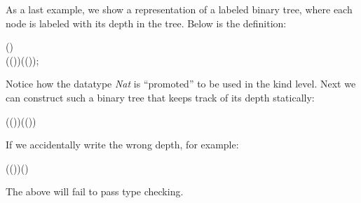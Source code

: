 As a last example, we show a representation of a labeled binary tree,
where each node is labeled with its depth in the tree. Below is the
definition:
\begin{hscode}\SaveRestoreHook
{}%
%
%
%
\>[3]{}\;\;(\mathbin{:})\mathrel{=}\<[E]%
\\
\>[3]{}\<[5]%
\>[5]{}\mid {}\;\;(\;(\;))\;(\;(\;));{}\<[E]%
\ColumnHook
\end{hscode}\resethooks
Notice how the datatype \emph{Nat} is ``promoted'' to be used in the
kind level. Next we can construct such a binary tree that keeps track
of its depth statically:\begin{hscode}\SaveRestoreHook
{}%
%
%
\>[3]{}\;\;\;(\;(\;))\;(\;(\;)){}\<[E]%
\ColumnHook
\end{hscode}\resethooks
If we accidentally write the wrong depth, for example:\begin{hscode}\SaveRestoreHook
{}%
%
%
\>[3]{}\;\;\;(\;(\;))\;(\;){}\<[E]%
\ColumnHook
\end{hscode}\resethooks
The above will fail to pass type checking.

  

 
